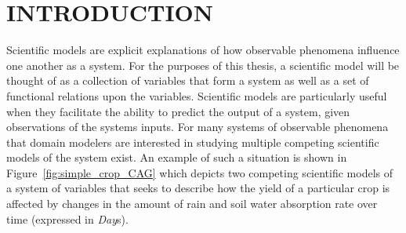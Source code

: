 \chapter{INTRODUCTION\label{chapter:introduction}}
Scientific models are explicit explanations of how observable phenomena influence one another as a system.
For the purposes of this thesis, a scientific model will be thought of as a collection of variables that form a system as well as a set of functional relations upon the variables.
Scientific models are particularly useful when they facilitate the ability to predict the output of a system, given observations of the systems inputs.
For many systems of observable phenomena that domain modelers are interested in studying multiple competing scientific models of the system exist.
An example of such a situation is shown in Figure~\ref{fig:simple_crop_CAG} which depicts two competing scientific models of a system of variables that seeks to describe how the yield of a particular crop is affected by changes in the amount of rain and soil water absorption rate over time (expressed in \emph{Day}s).

